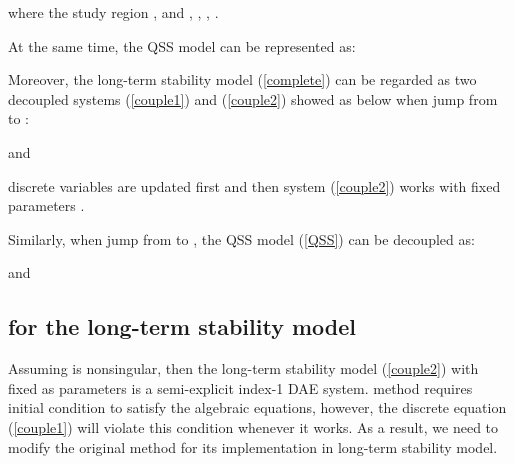 \documentclass[journal]{IEEEtran}
\begin{document}
where the study region , and , , , .

At the same time, the QSS model can be represented as:



Moreover, the long-term stability model (\ref{complete}) can be regarded as two decoupled systems (\ref{couple1}) and (\ref{couple2}) showed as below when  jump from  to :

and

discrete variables  are updated first and then system (\ref{couple2}) works with fixed parameters .

Similarly, when  jump from  to , the QSS model (\ref{QSS}) can be decoupled as:

and


\subsection{ for the long-term stability model}
Assuming  is nonsingular, then the long-term stability model (\ref{couple2}) with  fixed as parameters is a semi-explicit index-1 DAE system.  method requires initial condition to satisfy the algebraic equations, however, the discrete equation (\ref{couple1}) will violate this condition whenever it works. As a result, we need to modify the original  method for its implementation in long-term stability model.
\end{document}
